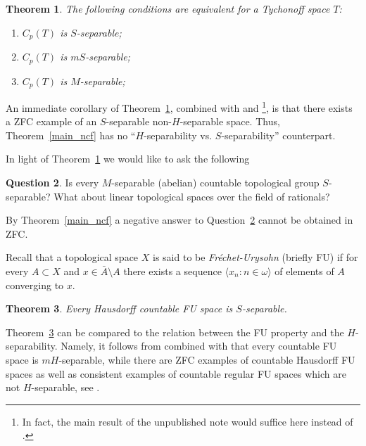\documentclass[12pt,a4paper]{amsart}
\newtheorem{theorem}{Theorem}[section]
\theoremstyle{definition}
\newtheorem{question}[theorem]{Question}
\newcommand{\w}{\omega}
\newcommand{\la}{\langle}
\newcommand{\ra}{\rangle}
\begin{document}
\begin{theorem} \label{main_cp}
The following conditions are equivalent for 
a Tychonoff space $T$:
\begin{enumerate}
\item $C_p(T)$ is $S$-separable;
\item $C_p(T)$ is $mS$-separable;
\item $C_p(T)$ is $M$-separable;
\end{enumerate}
\end{theorem}

An immediate corollary of Theorem~\ref{main_cp},
combined with \cite[Theorems~21 and 40]{BelBonMat09} and \cite[Theorem~8.10]{TsaZdo08}\footnote{In fact, the main result of the unpublished note \cite{ChaPol02} would suffice here instead of \cite[Theorem~8.10]{TsaZdo08}.},  is that there exists a ZFC example of an
$S$-separable non-$H$-separable space. Thus, Theorem~\ref{main_ncf}
has no  ``$H$-separability vs. $S$-separability'' counterpart. 

In light of Theorem~\ref{main_cp} we would like to ask the following

\begin{question} \label{top_group}
Is every $M$-separable (abelian) countable topological group $S$-separable?
What about linear topological spaces over the field of rationals?
\end{question}

By Theorem~\ref{main_ncf} a negative answer to Question~\ref{top_group}
cannot be obtained in ZFC.

Recall that a topological space $X$ is said to be  
\emph{Fr\'echet-Urysohn} (briefly FU) if for every $A\subset X$
and $x\in\bar{A}\setminus A$ there exists a sequence $\la x_n:n\in\w\ra$
of elements of $A$ converging to $x$.

\begin{theorem} \label{fu_vs_s}
  Every {Hausdorff} countable FU  space is $S$-separable.
\end{theorem}

Theorem~\ref{fu_vs_s} can be compared to the  
relation between the FU property and the $H$-separability.
Namely, it follows from \cite[Lemma 2.7(2)]{GruSak11}
 combined with \cite[Corollary
4.2]{GruSak11}  that every countable FU space is $mH$-separable,
while there are ZFC examples of countable  Hausdorff FU spaces
as well as consistent examples of countable regular FU spaces which are 
 not $H$-separable, see \cite[Sections~2 and 3]{BarMaeZdo23}.
\end{document}
